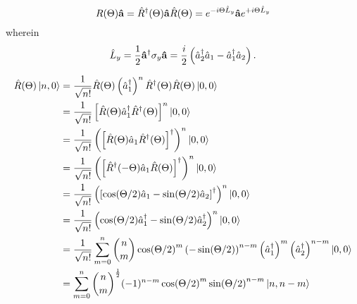 \begin{equation}
	R(\Theta)
	\vb{\hat{a}}
	=
	\hat{R}^\dagger(\Theta)
	\vb{\hat{a}}
	\hat{R}(\Theta)
	=
	e^{-i\Theta\hat{L}_y}
	\vb{\hat{a}}
	e^{+i\Theta\hat{L}_y}
\end{equation}
wherein~\cite[p.~97]{Leonhardt2010}
\begin{equation}
	\hat{L}_y
	=
	\frac{1}{2}
	\vb{\hat{a}}^\dagger
	\sigma_y
	\vb{\hat{a}}
	=
	\frac{i}{2}
	\left(
		\hat{a}_2^\dagger
		\hat{a}_1
		-
		\hat{a}_1^\dagger
		\hat{a}_2
	\right)
	.
\end{equation}

\begin{equation}
	\begin{split}
		\hat{R}(\Theta)
		\ket{n,0}
		&=
		\frac{1}{\sqrt{n!}}
		\hat{R}(\Theta)
		\left(\hat{a}_1^\dagger\right)^n
		\hat{R}^\dagger(\Theta)
		\hat{R}(\Theta)
		\ket{0,0}
		\\
		&=
		\frac{1}{\sqrt{n!}}
		\left[
			\hat{R}(\Theta)
			\hat{a}_1^\dagger
			\hat{R}^\dagger(\Theta)
		\right]^n
		\ket{0,0}
		\\
		&=
		\frac{1}{\sqrt{n!}}
		\left(
			\left[
				\hat{R}(\Theta)
				\hat{a}_1
				\hat{R}^\dagger(\Theta)
			\right]^\dagger
		\right)^n
		\ket{0,0}
		\\
		&=
		\frac{1}{\sqrt{n!}}
		\left(
			\left[
				\hat{R}^\dagger(-\Theta)
				\hat{a}_1
				\hat{R}(\Theta)
			\right]^\dagger
		\right)^n
		\ket{0,0}
		\\
		&=
		\frac{1}{\sqrt{n!}}
		\left(
			\left[
				\cos(\Theta/2)
				\hat{a}_1
				-
				\sin(\Theta/2)
				\hat{a}_2
			\right]^\dagger
		\right)^n
		\ket{0,0}
		\\
		&=
		\frac{1}{\sqrt{n!}}
		\left(
			\cos(\Theta/2)
			\hat{a}_1^\dagger
			-
			\sin(\Theta/2)
			\hat{a}_2^\dagger
		\right)^n
		\ket{0,0}
		\\
		&=
		\frac{1}{\sqrt{n!}}
		\sum_{m=0}^n
		\binom{n}{m}
		\cos(\Theta/2)^m
		\left(
			-\sin(\Theta/2)
		\right)^{n-m}
		\left(\hat{a}_1^\dagger\right)^m
		\left(\hat{a}_2^\dagger\right)^{n-m}
		\ket{0,0}
		\\
		&=
		\sum_{m=0}^n
		\binom{n}{m}^\frac{1}{2}
		(-1)^{n-m}
		\cos(\Theta/2)^m
		\sin(\Theta/2)^{n-m}
		\ket{n,n-m}
	\end{split}
\end{equation}

